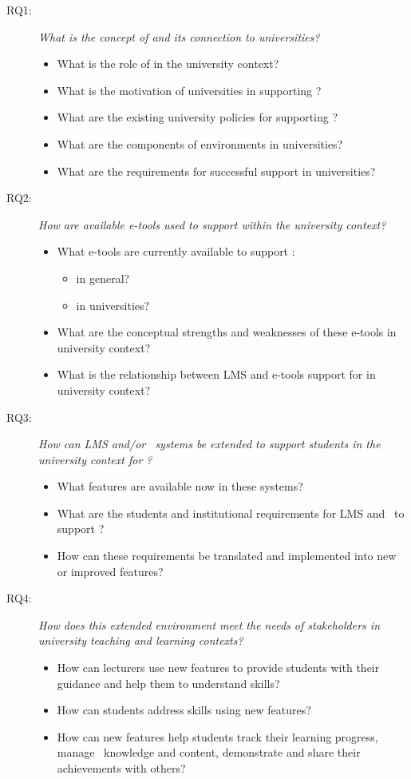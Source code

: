 \begin{description}
  \item[RQ1:] \textit{What is the concept of \LLLs and its connection to 
  universities?}
	\begin{itemize}
	  \item What is the role of \LLLs in the university context?
	  \item What is the motivation of universities in supporting \LLLsn?
  	  \item What are the existing university policies for supporting \LLLsn?
      \item What are the components of \LLLs environments in universities?
      \item What are the requirements for successful \LLLs support in
   universities?
	\end{itemize} 
	
   \item[RQ2:] \textit{How are available e-tools used to support \LLLs within
   the university context?}
	\begin{itemize}
		\item What e-tools are currently available to support \LLLsn:
			\begin{itemize}
				\item in general?
				\item in universities?
			\end{itemize}
		\item What are the conceptual strengths and weaknesses of these e-tools in
		university context?
		\item What is the relationship between LMS and e-tools support for \LLLs in
		university context?
	\end{itemize}

	\item[RQ3:] \textit{How can LMS and/or \ep~systems be extended to support
	students in the university context for \LLLsn?}
	\begin{itemize}
		\item What features are available now in these systems?
		\item What are the students and institutional requirements for LMS and
		\ep~to support \LLLsn?
		\item How can these requirements be translated and implemented into new or
		improved features?
	\end{itemize}

	\item[RQ4:] \textit{How does this extended environment meet the needs of 
	stakeholders in university teaching and learning contexts?}
	\begin{itemize}
		\item How can lecturers use new features to provide students with their
		guidance and help them to understand \LLLs skills?
		\item How can students address \LLLs skills using new features?
		\item How can new features help students track their learning progress, manage
		\ep~knowledge and content, demonstrate and share their achievements with
		others?
	\end{itemize}
\end{description}


